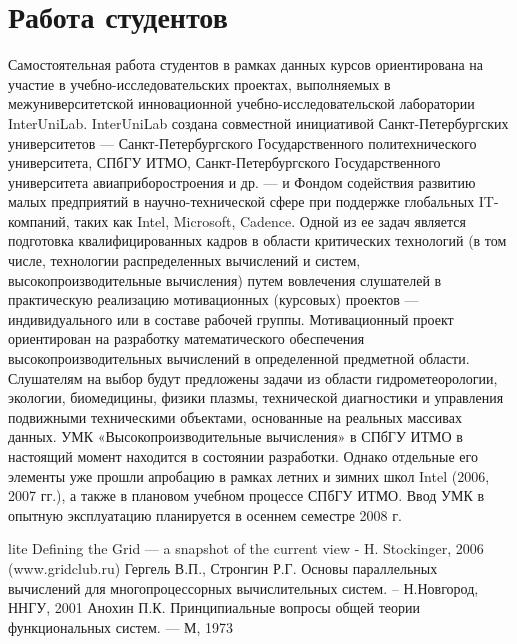 \documentclass[12pt]{article}
\begin{document}
\section{Работа студентов}
\indent\indent Самостоятельная работа студентов в рамках данных курсов ориентирована на участие в учебно-исследовательских проектах, выполняемых в межуниверситетской инновационной учебно-исследовательской лаборатории InterUniLab. InterUniLab создана совместной инициативой Санкт-Петербургских университетов — Санкт-Петербургского Государственного политехнического университета, СПбГУ ИТМО, Санкт-Петербургского Государственного университета авиаприборостроения и др. — и Фондом содействия развитию малых предприятий в научно-технической сфере при поддержке глобальных IT-компаний, таких как Intel, Microsoft, Cadence. Одной из ее задач является подготовка квалифицированных кадров в области критических технологий (в том числе, технологии распределенных вычислений и систем, высокопроизводительные вычисления) путем вовлечения слушателей в практическую реализацию мотивационных (курсовых) проектов — индивидуального или в составе рабочей группы. Мотивационный проект ориентирован на разработку математического обеспечения высокопроизводительных вычислений в определенной предметной области. Слушателям на выбор будут предложены задачи из области гидрометеорологии, экологии, биомедицины, физики плазмы, технической диагностики и управления подвижными техническими объектами, основанные на реальных массивах данных. \newline
\indent УМК «Высокопроизводительные вычисления» в СПбГУ ИТМО в настоящий момент находится в состоянии разработки. Однако отдельные его элементы уже прошли апробацию в рамках летних и зимних школ Intel (2006, 2007 гг.), а также в плановом учебном процессе СПбГУ ИТМО. Ввод УМК в опытную эксплуатацию планируется в осеннем семестре 2008 г.

\thispagestyle{plain}

\newpage
\begin {thebibliography}
{lite}
 Defining the Grid — a snapshot of the current view - H. Stockinger, 2006 (www.gridclub.ru)
 Гергель В.П., Стронгин Р.Г. Основы параллельных вычислений для многопроцессорных вычислительных систем. – Н.Новгород, ННГУ, 2001
 Анохин П.К. Принципиальные вопросы общей теории функциональных систем. — М, 1973
\end {thebibliography}
\end{document}
